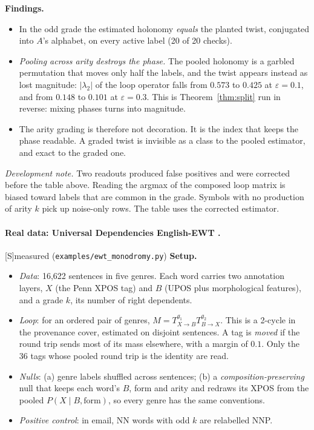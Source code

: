 \documentclass[11pt]{article}
\theoremstyle{definition}
\theoremstyle{remark}
\newcommand{\src}[1]{\textsf{\small[#1]}}
\newcommand{\st}[1]{\textsf{\small\color{gray}#1}}
\begin{document}
\noindent\textbf{Findings.}
\begin{itemize}
  \item In the odd grade the estimated holonomy \emph{equals} the planted twist, conjugated into $A$'s alphabet, on every active label (20 of 20 checks).
  \item \emph{Pooling across arity destroys the phase.} The pooled holonomy is a garbled permutation that moves only half the labels, and the twist appears instead as lost magnitude: $|\lambda_2|$ of the loop operator falls from $0.573$ to $0.425$ at $\varepsilon=0.1$, and from $0.148$ to $0.101$ at $\varepsilon=0.3$. This is Theorem~\ref{thm:split} run in reverse: mixing phases turns into magnitude.
  \item The arity grading is therefore not decoration. It is the index that keeps the phase readable. A graded twist is invisible as a class to the pooled estimator, and exact to the graded one.
\end{itemize}
\emph{Development note.} Two readouts produced false positives and were corrected before the table above. Reading the argmax of the composed loop matrix is biased toward labels that are common in the grade. Symbols with no production of arity $k$ pick up noise-only rows. The table uses the corrected estimator.

\paragraph{Real data: Universal Dependencies English-EWT \cite{ud}.}\src{S}\st{measured} (\texttt{examples/ewt\_monodromy.py})
\textbf{Setup.}
\begin{itemize}
  \item \emph{Data}: 16{,}622 sentences in five genres. Each word carries two annotation layers, $X$ (the Penn XPOS tag) and $B$ (UPOS plus morphological features), and a grade $k$, its number of right dependents.
  \item \emph{Loop}: for an ordered pair of genres, $M=T^{g_1}_{X\to B}T^{g_2}_{B\to X}$. This is a 2-cycle in the provenance cover, estimated on disjoint sentences. A tag is \emph{moved} if the round trip sends most of its mass elsewhere, with a margin of $0.1$. Only the 36 tags whose pooled round trip is the identity are read.
  \item \emph{Nulls}: (a) genre labels shuffled across sentences; (b) a \emph{composition-preserving} null that keeps each word's $B$, form and arity and redraws its XPOS from the pooled $P(X\mid B,\text{form})$, so every genre has the same conventions.
  \item \emph{Positive control}: in email, NN words with odd $k$ are relabelled NNP.
\end{itemize}
\end{document}
